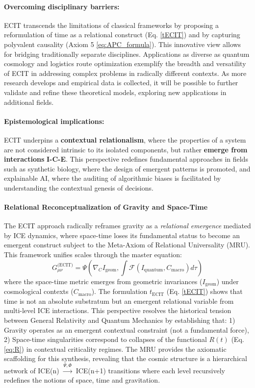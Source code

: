 \documentclass{article}
\begin{document}
\paragraph{Overcoming disciplinary barriers:} ECIT transcends the limitations of classical frameworks by proposing a reformulation of time as a relational construct (Eq. \ref{tECIT}) and by capturing polyvalent causality (Axiom 5 \ref{eq:APC_formula}). This innovative view allows for bridging traditionally separate disciplines. Applications as diverse as quantum cosmology and logistics route optimization exemplify the breadth and versatility of ECIT in addressing complex problems in radically different contexts. As more research develops and empirical data is collected, it will be possible to further validate and refine these theoretical models, exploring new applications in additional fields.

\paragraph{Epistemological implications:} ECIT underpins a \textbf{contextual relationalism}, where the properties of a system are not considered intrinsic to its isolated components, but rather \textbf{emerge from interactions} \textbf{I-C-E}. This perspective redefines fundamental approaches in fields such as synthetic biology, where the design of emergent patterns is promoted, and explainable AI, where the auditing of algorithmic biases is facilitated by understanding the contextual genesis of decisions.

\paragraph{Relational Reconceptualization of Gravity and Space-Time}
The ECIT approach radically reframes gravity as a \textit{relational emergence} mediated by ICE dynamics, where space-time loses its fundamental status to become an emergent construct subject to the Meta-Axiom of Relational Universality (MRU). This framework unifies scales through the master equation:
\begin{equation}
    G_{\mu\nu}^{\text{(ECIT)}} = \Psi\left( \nabla_{C}I_{\text{geom}}, \int \mathcal{F}(I_{\text{quantum}}, C_{\text{macro}}) d\tau \right)
\end{equation}
where the space-time metric emerges from geometric invariances ($I_{\text{geom}}$) under cosmological contexts ($C_{\text{macro}}$). The formulation $t_{\text{ECIT}}$ (Eq. \ref{tECIT}) shows that time is not an absolute substratum but an emergent relational variable from multi-level ICE interactions. This perspective resolves the historical tension between General Relativity and Quantum Mechanics by establishing that: 1) Gravity operates as an emergent contextual constraint (not a fundamental force), 2) Space-time singularities correspond to collapses of the functional $R(t)$ (Eq. \ref{eq:R}) in contextual criticality regimes. The MRU provides the axiomatic scaffolding for this synthesis, revealing that the cosmic structure is a hierarchical network of ICE(n) $\xrightarrow{\Psi,\Phi}$ ICE(n+1) transitions where each level recursively redefines the notions of space, time and gravitation.
\end{document}
